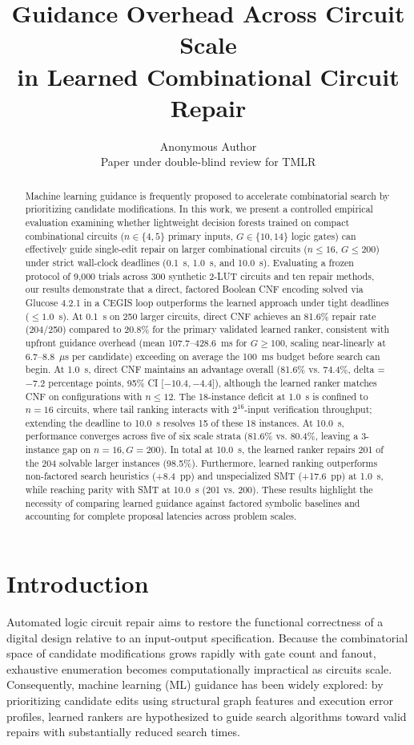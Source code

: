 \documentclass[11pt]{article}
\title{Guidance Overhead Across Circuit Scale\\in Learned Combinational Circuit Repair}
\author{\name Anonymous Author \\
        \addr Paper under double-blind review for TMLR}
\begin{document}
\maketitle

\begin{abstract}
Machine learning guidance is frequently proposed to accelerate combinatorial search by prioritizing candidate modifications. In this work, we present a controlled empirical evaluation examining whether lightweight decision forests trained on compact combinational circuits ($n \in \{4, 5\}$ primary inputs, $G \in \{10, 14\}$ logic gates) can effectively guide single-edit repair on larger combinational circuits ($n \le 16$, $G \le 200$) under strict wall-clock deadlines (0.1~s, 1.0~s, and 10.0~s). Evaluating a frozen protocol of 9,000 trials across 300 synthetic 2-LUT circuits and ten repair methods, our results demonstrate that a direct, factored Boolean CNF encoding solved via Glucose 4.2.1 in a CEGIS loop outperforms the learned approach under tight deadlines ($\le 1.0$~s). At 0.1~s on 250 larger circuits, direct CNF achieves an 81.6\% repair rate (204/250) compared to 20.8\% for the primary validated learned ranker, consistent with upfront guidance overhead (mean 107.7--428.6~ms for $G \ge 100$, scaling near-linearly at 6.7--8.8~$\mu$s per candidate) exceeding on average the 100~ms budget before search can begin. At 1.0~s, direct CNF maintains an advantage overall (81.6\% vs. 74.4\%, delta = $-7.2$ percentage points, 95\% CI [$-10.4, -4.4$]), although the learned ranker matches CNF on configurations with $n \le 12$. The 18-instance deficit at 1.0~s is confined to $n=16$ circuits, where tail ranking interacts with $2^{16}$-input verification throughput; extending the deadline to 10.0~s resolves 15 of these 18 instances. At 10.0~s, performance converges across five of six scale strata (81.6\% vs. 80.4\%, leaving a 3-instance gap on $n=16, G=200$). In total at 10.0~s, the learned ranker repairs 201 of the 204 solvable larger instances (98.5\%). Furthermore, learned ranking outperforms non-factored search heuristics (+8.4~pp) and unspecialized SMT (+17.6~pp) at 1.0~s, while reaching parity with SMT at 10.0~s (201 vs. 200). These results highlight the necessity of comparing learned guidance against factored symbolic baselines and accounting for complete proposal latencies across problem scales.
\end{abstract}

\section{Introduction}
Automated logic circuit repair aims to restore the functional correctness of a digital design relative to an input-output specification. Because the combinatorial space of candidate modifications grows rapidly with gate count and fanout, exhaustive enumeration becomes computationally impractical as circuits scale. Consequently, machine learning (ML) guidance has been widely explored: by prioritizing candidate edits using structural graph features and execution error profiles, learned rankers are hypothesized to guide search algorithms toward valid repairs with substantially reduced search times.
\end{document}

